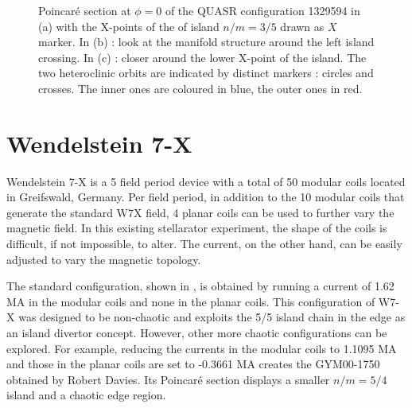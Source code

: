 \begin{figure}[H]
\begin{subfigure}[c]{0.44\textwidth}
        \caption{}
        \label{fig:turn-1329594}
    \end{subfigure}
    \caption{Poincaré section at $\phi=0$ of the QUASR configuration 1329594 in (a) with the X-points of the of island $n/m = 3/5$ drawn as $X$ marker. In (b) : look at the manifold structure around the left island crossing. In (c) : closer around the lower X-point of the island. The two heteroclinic orbits are indicated by distinct markers : circles and crosses. The inner ones are coloured in blue, the outer ones in red.}
    \label{fig:pmt-1329594}
\end{figure}

\section{Wendelstein 7-X}\label{sec:w7x}

Wendelstein 7-X is a 5 field period device with a total of 50 modular coils located in Greifswald, Germany. Per field period, in addition to the 10 modular coils that generate the standard W7X field, 4 planar coils can be used to further vary the magnetic field. In this existing stellarator experiment, the shape of the coils is difficult, if not impossible, to alter. The current, on the other hand, can be easily adjusted to vary the magnetic topology.

The standard configuration, shown in , is obtained by running a current of 1.62 MA in the modular coils and none in the planar coils. This configuration of W7-X was designed to be non-chaotic and exploits the 5/5 island chain in the edge as an island divertor concept. However, other more chaotic configurations can be explored. For example, reducing the currents in the modular coils to 1.1095 MA and those in the planar coils are set to -0.3661 MA creates the GYM00-1750 obtained by Robert Davies. Its Poincar\'e section  displays a smaller $n/m = 5/4$ island and a chaotic edge region.

